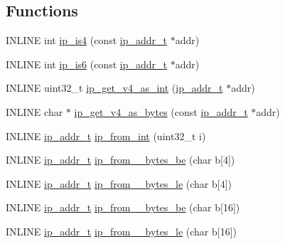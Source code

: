\subsection*{Functions}
\begin{DoxyCompactItemize}
\item 
I\+N\+L\+I\+NE int \hyperlink{group__ur__ipaddr_gabf382d0ceec2ca2d62cb94ecf000ecd4}{ip\+\_\+is4} (const \hyperlink{group__ur__ipaddr_ga25f353236a342b23c6eb35f4a87176b5}{ip\+\_\+addr\+\_\+t} $\ast$addr)
\item 
I\+N\+L\+I\+NE int \hyperlink{group__ur__ipaddr_gaeaa8f3d94315e53ebf8c43c7dde8f6cb}{ip\+\_\+is6} (const \hyperlink{group__ur__ipaddr_ga25f353236a342b23c6eb35f4a87176b5}{ip\+\_\+addr\+\_\+t} $\ast$addr)
\item 
I\+N\+L\+I\+NE uint32\+\_\+t \hyperlink{group__ur__ipaddr_gae6ab3a77cab8533289729b25c9438689}{ip\+\_\+get\+\_\+v4\+\_\+as\+\_\+int} (\hyperlink{group__ur__ipaddr_ga25f353236a342b23c6eb35f4a87176b5}{ip\+\_\+addr\+\_\+t} $\ast$addr)
\item 
I\+N\+L\+I\+NE char $\ast$ \hyperlink{group__ur__ipaddr_gac2c790297e16730292696c44306dd1a6}{ip\+\_\+get\+\_\+v4\+\_\+as\+\_\+bytes} (const \hyperlink{group__ur__ipaddr_ga25f353236a342b23c6eb35f4a87176b5}{ip\+\_\+addr\+\_\+t} $\ast$addr)
\item 
I\+N\+L\+I\+NE \hyperlink{group__ur__ipaddr_ga25f353236a342b23c6eb35f4a87176b5}{ip\+\_\+addr\+\_\+t} \hyperlink{group__ur__ipaddr_gad57ac58e8823c5197445e9035843a417}{ip\+\_\+from\+\_\+int} (uint32\+\_\+t i)
\item 
I\+N\+L\+I\+NE \hyperlink{group__ur__ipaddr_ga25f353236a342b23c6eb35f4a87176b5}{ip\+\_\+addr\+\_\+t} \hyperlink{group__ur__ipaddr_ga2c694d465f540e700d91a655f6d47ebd}{ip\+\_\+from\+\_\+\_\+bytes\+\_\+be} (char b\mbox{[}4\mbox{]})
\item 
I\+N\+L\+I\+NE \hyperlink{group__ur__ipaddr_ga25f353236a342b23c6eb35f4a87176b5}{ip\+\_\+addr\+\_\+t} \hyperlink{group__ur__ipaddr_ga34b4da3670a99958f7038c90da2b7152}{ip\+\_\+from\+\_\+\_\+bytes\+\_\+le} (char b\mbox{[}4\mbox{]})
\item 
I\+N\+L\+I\+NE \hyperlink{group__ur__ipaddr_ga25f353236a342b23c6eb35f4a87176b5}{ip\+\_\+addr\+\_\+t} \hyperlink{group__ur__ipaddr_ga61daf049c5a24cd2a331d916694a4fef}{ip\+\_\+from\+\_\+\_\+bytes\+\_\+be} (char b\mbox{[}16\mbox{]})
\item 
I\+N\+L\+I\+NE \hyperlink{group__ur__ipaddr_ga25f353236a342b23c6eb35f4a87176b5}{ip\+\_\+addr\+\_\+t} \hyperlink{group__ur__ipaddr_ga35a767afac198cabbbb7cf5ea70c9e33}{ip\+\_\+from\+\_\+\_\+bytes\+\_\+le} (char b\mbox{[}16\mbox{]})

\end{DoxyCompactItemize}
